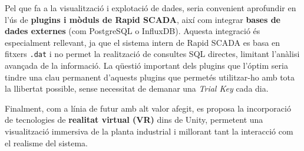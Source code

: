 \documentclass[12pt,a4paper]{report}
\begin{document}
Pel que fa a la visualització i explotació de dades, seria convenient aprofundir en l'ús de \textbf{plugins i mòduls de Rapid SCADA}, així com integrar \textbf{bases de dades externes} (com PostgreSQL o InfluxDB). Aquesta integració és especialment rellevant, ja que el sistema intern de Rapid SCADA es basa en fitxers \texttt{.dat} i no permet la realització de consultes SQL directes, limitant l'anàlisi avançada de la informació. La qüestió important dels plugins que l'óptim seria tindre una clau permanent d'aquests plugins que permetés utilitzar-ho amb tota la llibertat possible, sense necessitat de demanar una \textit{Trial Key} cada dia.

Finalment, com a línia de futur amb alt valor afegit, es proposa la incorporació de tecnologies de \textbf{realitat virtual (VR)} dins de Unity, permetent una visualització immersiva de la planta industrial i millorant tant la interacció com el realisme del sistema.
\end{document}
